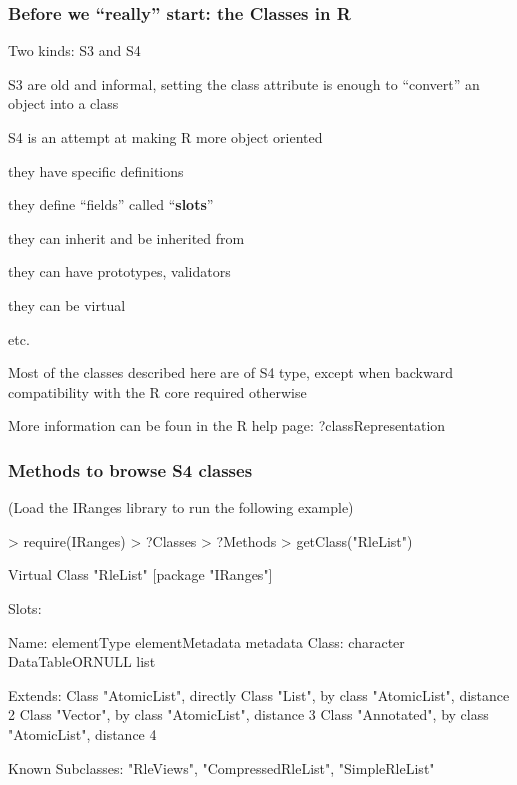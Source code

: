 \documentclass{beamer}
\begin{document}

\begin{frame}
\frametitle{Before we ``really'' start: the Classes in R}
 \bit
      \item Two kinds: S3 and S4
        \bit
	          \item S3 are old and informal, setting the class attribute is enough to ``convert'' an object into a class
	          \item S4 is an attempt at making R more object oriented
	            \bit
		              \item they have specific definitions
		              \item they define ``fields'' called ``\textbf{slots}''
		              \item they can inherit and be inherited from
		              \item they can have prototypes, validators
		              \item they can be virtual
		              \item etc.
	            \eit
	          \item Most of the classes described here are of S4 type, except when backward compatibility with the R core required otherwise
	          \item More information can be foun in the R help page: ?classRepresentation
       \eit
 \eit
\end{frame}


\begin{frame}[fragile]
\frametitle{Methods to browse S4 classes}
(Load the IRanges library to run the following example)
    \begin{uncoverenv}
\begin{Schunk}
\begin{Sinput}
> require(IRanges)
> ?Classes
> ?Methods
> getClass("RleList")
\end{Sinput}
\begin{Soutput}
Virtual Class "RleList" [package "IRanges"]

Slots:
                                                      
Name:      elementType elementMetadata        metadata
Class:       character DataTableORNULL            list

Extends: 
Class "AtomicList", directly
Class "List", by class "AtomicList", distance 2
Class "Vector", by class "AtomicList", distance 3
Class "Annotated", by class "AtomicList", distance 4

Known Subclasses: "RleViews", "CompressedRleList", "SimpleRleList"
\end{Soutput}
\end{Schunk}
    \end{uncoverenv}
\end{frame}
\end{document}
